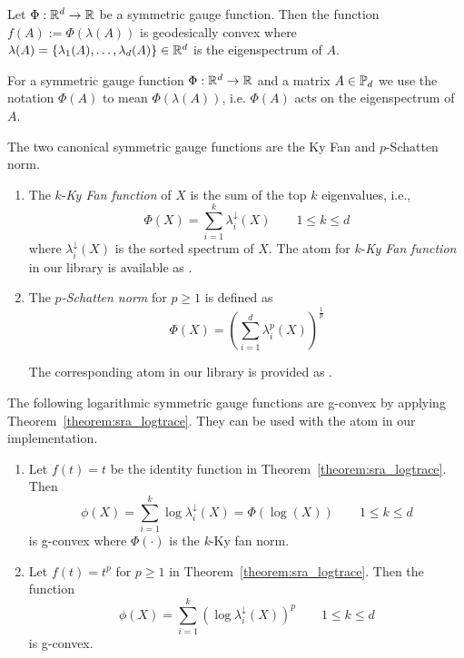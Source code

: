 \documentclass[twoside,11pt]{article}
\begin{document}
\begin{prop}\label{prop:sgf_gvx}
 Let $\Phi: \mathbb{R}^d \to \mathbb{R}$ be a symmetric gauge function. Then the function  $f(A) := \Phi(\lambda(A))$ is geodesically convex where $\lambda(A) = \{\lambda_1(A), \ldots, \lambda_d(A)\} \in \mathbb{R}^d$ is the eigenspectrum of $A$.
\end{prop}

\begin{remark}
    For a symmetric gauge function $\Phi: \mathbb{R}^d \to \mathbb{R}$ and a matrix $A \in \mathbb{P}_d$ we use the notation $\Phi(A)$ to mean $\Phi(\lambda(A))$, i.e. $\Phi(A)$ acts on the eigenspectrum of $A$.
\end{remark}

\begin{example}
    The two canonical symmetric gauge functions are the Ky Fan and $p$-Schatten norm.
    \begin{enumerate}
        \item The $k$-\emph{Ky Fan function} of $X$ is the sum of the top $k$ eigenvalues, i.e., 
        \[
        \Phi(X) = \sum_{i=1}^k \lambda_i^\downarrow(X) \qquad 1 \leq k \leq d
        \]
        where $\lambda_i^\downarrow(X)$ is the sorted spectrum of $X$. The atom for $k$-\emph{Ky Fan function} in our library is available as . 
        \item The \emph{$p$-Schatten norm} for $p \geq 1$ is defined as 
        \[
        \Phi(X) = \left(\sum_{i=1}^d \lambda^p_i(X)\right)^{\frac{1}{p}}
        \]

        The corresponding atom in our library is provided as .
    \end{enumerate}
\end{example}



\begin{example}
    The following logarithmic symmetric gauge functions are g-convex by applying Theorem~\ref{theorem:sra_logtrace}. They can be used with the  atom in our implementation.
    \begin{enumerate}
        \item Let $f(t) = t$ be the identity function in Theorem~\ref{theorem:sra_logtrace}. Then 
        \[
        \phi(X) = \sum_{i=1}^k \log \lambda_i^\downarrow(X) = \Phi(\log(X)) \qquad 1 \leq k \leq d
        \]
    is g-convex where $\Phi(\cdot)$ is the \textit{k}-Ky fan norm. 
    \item Let $f(t) = t^p$ for $p \geq 1$ in Theorem~\ref{theorem:sra_logtrace}. Then the function
    \[
    \phi(X) = \sum_{i=1}^k \left(\log \lambda^\downarrow_i(X)\right)^p \qquad 1 \leq k \leq d
    \]
    is g-convex. 
    \end{enumerate}

\end{example}
\end{document}
